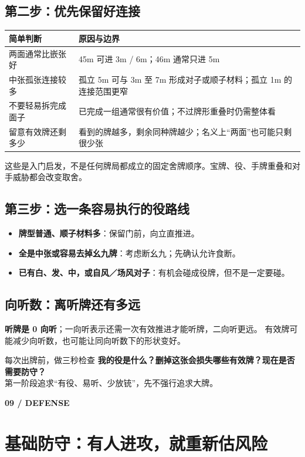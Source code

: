 \documentclass[UTF8,a4paper,zihao=5,fontset=fandol]{ctexart}
\newcommand{\pageintro}[3]{\clearpage\phantomsection\label{#1}
 {\small\sffamily\bfseries\color{gold}#2}\par\vspace{2pt}\section{#3}}
\newcommand{\smalltext}[1]{{\small\color{muted}#1}}
\newcommand{\notation}[1]{{\ttfamily\color{teal}#1}}
\begin{document}
\subsection{第二步：优先保留好连接}
\par\noindent\begin{tabularx}{\linewidth}{L{28mm}Y}
\toprule
简单判断 & 原因与边界\\
\midrule
两面通常比嵌张好 & \notation{45m} 可进 \notation{3m / 6m}；\notation{46m} 通常只进 \notation{5m}\\
中张孤张连接较多 & 孤立 \notation{5m} 可与 \notation{3m} 至 \notation{7m} 形成对子或顺子材料；孤立 \notation{1m} 的连接范围更窄\\
不要轻易拆完成面子 & 已完成一组通常很有价值；不过牌形重叠时仍需整体看\\
留意有效牌还剩多少 & 看到的牌越多，剩余同种牌越少；名义上“两面”也可能只剩很少张\\
\bottomrule
\end{tabularx}\par\vspace{3pt}
\smalltext{这些是入门启发，不是任何牌局都成立的固定舍牌顺序。宝牌、役、手牌重叠和对手威胁都会改变取舍。}

\subsection{第三步：选一条容易执行的役路线}
\begin{itemize}
\item \textbf{牌型普通、顺子材料多}：保留门前，向立直推进。
\item \textbf{全是中张或容易去掉幺九牌}：考虑断幺九；先确认允许食断。
\item \textbf{已有白、发、中，或自风／场风对子}：有机会碰成役牌，但不是一定要碰。
\end{itemize}
\subsection{向听数：离听牌还有多远}
\textbf{听牌是 0 向听}；一向听表示还需一次有效推进才能听牌，二向听更远。
有效牌可能减少向听数，也可能让同向听数下的形状变好。
\begin{note}{每次出牌前，做三秒检查}
\textbf{我的役是什么？删掉这张会损失哪些有效牌？现在是否需要防守？}\\
第一阶段追求“有役、易听、少放铳”，先不强行追求大牌。
\end{note}

\pageintro{defense}{09 / DEFENSE}{基础防守：有人进攻，就重新估风险}
\end{document}
